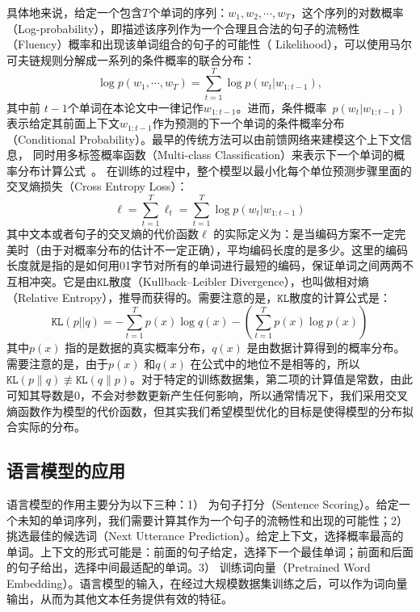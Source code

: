 具体地来说，给定一个包含$T$个单词的序列：$w_1,w_2,\cdots,w_T$，这个序列的对数概率（Log-probability），即描述该序列作为一个合理且合法的句子的流畅性（Fluency）概率和出现该单词组合的句子的可能性（ Likelihood），可以使用马尔可夫链规则分解成一系列的条件概率的联合分布：
\begin{equation}
\label{laguage_model}
 \log p(w_1,\cdots, w_T ) = \sum_{t=1}^T \log p(w_t | w_{1:t-1}),
\end{equation}
其中前 $t-1$个单词在本论文中一律记作$w_ {1:t-1}$。进而，条件概率~$p(w_t | w_ {1:t-1})$表示给定其前面上下文$w_ {1:t-1} $作为预测的下一个单词的条件概率分布（Conditional Probability）。最早的传统方法可以由前馈网络来建模这个上下文信息， 同时用多标签概率函数（Multi-class Classification）来表示下一个单词的概率分布计算公式~。 在训练的过程中，整个模型以最小化每个单位预测步骤里面的交叉熵损失（Cross Entropy Loss）：
\begin{equation}\label{equ:losses}
  \ell=\sum_{t=1}^{T}\ell_t=\sum_{t=1}^{T}\log p(w_t | w_{1:t-1})
\end{equation}
其中文本或者句子的交叉熵的代价函数$\ell$ 的实际定义为：是当编码方案不一定完美时（由于对概率分布的估计不一定正确），平均编码长度的是多少。这里的编码长度就是指的是如何用01字节对所有的单词进行最短的编码，保证单词之间两两不互相冲突。它是由$ \texttt{KL}$散度（Kullback–Leibler Divergence），也叫做相对熵（Relative Entropy），推导而获得的。需要注意的是，$  \texttt{KL}   $散度的计算公式是：
\begin{equation}\label{equ:losses}
  \texttt{KL}(p||q)=-\sum_{t=1}^{T}p(x)\log q(x) - (\sum_{t=1}^{T}p(x)\log p(x))
\end{equation}
其中$p(x)$ 指的是数据的真实概率分布，$q(x)$ 是由数据计算得到的概率分布。需要注意的是，由于$p(x)$ 和$q(x)$ 在公式中的地位不是相等的，所以$   \texttt{KL} (p\parallel q)\not\equiv  \texttt{KL}  (q\parallel p)$。对于特定的训练数据集，第二项的计算值是常数，由此可知其导数是0，不会对参数更新产生任何影响，所以通常情况下，我们采用交叉熵函数作为模型的代价函数，但其实我们希望模型优化的目标是使得模型的分布拟合实际的分布。
\subsection{语言模型的应用}
语言模型的作用主要分为以下三种：1） 为句子打分（Sentence Scoring）。给定一个未知的单词序列，我们需要计算其作为一个句子的流畅性和出现的可能性；2） 挑选最佳的候选词（Next Utterance Prediction）。给定上下文，选择概率最高的单词。上下文的形式可能是：前面的句子给定，选择下一个最佳单词；前面和后面的句子给出，选择中间最适配的单词。3） 训练词向量（Pretrained Word Embedding）。语言模型的输入，在经过大规模数据集训练之后，可以作为词向量输出，从而为其他文本任务提供有效的特征。


